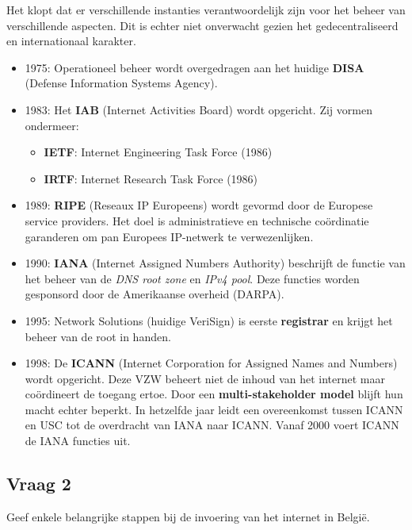 \documentclass[../main.tex]{subfiles}
\begin{document}
\begin{solution}
Het klopt dat er verschillende instanties verantwoordelijk zijn voor het beheer van verschillende aspecten. Dit is echter niet onverwacht gezien het gedecentraliseerd en internationaal karakter.
\begin{itemize}
	\item 1975: Operationeel beheer wordt overgedragen aan het huidige \textbf{DISA} (Defense Information Systems Agency).
	\item 1983: Het \textbf{IAB} (Internet Activities Board) wordt opgericht. Zij vormen ondermeer:
	\begin{itemize}
		\item \textbf{IETF}: Internet Engineering Task Force (1986)
		\item \textbf{IRTF}: Internet Research Task Force (1986)
	\end{itemize}
	\item 1989: \textbf{RIPE} (Reseaux IP Europeens) wordt gevormd door de Europese service providers. Het doel is administratieve en technische coördinatie garanderen om pan Europees IP-netwerk te verwezenlijken.
	\item 1990: \textbf{IANA} (Internet Assigned Numbers Authority) beschrijft de functie van het beheer van de \emph{DNS root zone} en \emph{IPv4 pool}. Deze functies worden gesponsord door de Amerikaanse overheid (DARPA).
	\item 1995: Network Solutions (huidige VeriSign) is eerste \textbf{registrar} en krijgt het beheer van de root in handen.
	\item 1998: De \textbf{ICANN} (Internet Corporation for Assigned Names and Numbers) wordt opgericht. Deze VZW beheert niet de inhoud van het internet maar co\"ordineert de toegang ertoe. Door een \textbf{multi-stakeholder model} blijft hun macht echter beperkt. In hetzelfde jaar leidt een overeenkomst tussen ICANN en USC tot de overdracht van IANA naar ICANN. Vanaf 2000 voert ICANN de IANA functies uit.
\end{itemize}
\end{solution}



\subsection{Vraag 2}
\begin{question}
Geef enkele belangrijke stappen bij de invoering van het internet in Belgi\"e.
\end{question}
\end{document}
